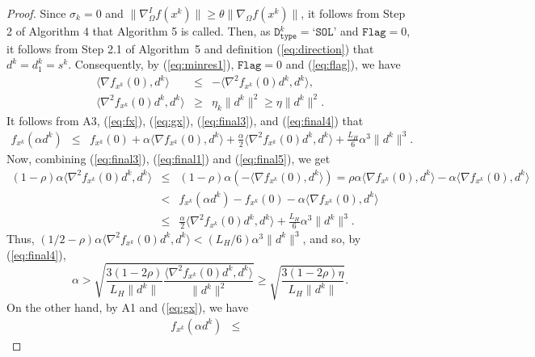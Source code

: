 \documentclass[11pt]{article}
\begin{document}
\begin{proof}
Since $\sigma_{k}=0$ and $\|\nabla_{\Omega}^{I}f(x^{k})\|\geq\theta\|\nabla_{\Omega}f(x^{k})\|$, it follows from Step 2 of Algorithm 4 that Algorithm 5 is called. Then, as $\texttt{D}_{\texttt{type}}^{k}=\texttt{`SOL'}$ and $\texttt{Flag}=0$, it follows from Step 2.1 of Algorithm~5 and definition (\ref{eq:direction}) that $d^{k}=d_{1}^{k}=s^{k}$. Consequently, by (\ref{eq:minres1}), $\texttt{Flag}=0$ and (\ref{eq:flag}), we have
\begin{eqnarray}
\langle\nabla f_{x^{k}}(0),d^{k}\rangle &\leq & -\langle\nabla^{2}f_{x^{k}}(0)d^{k},d^{k}\rangle,
\label{eq:final3}\\
\langle\nabla^{2}f_{x^{k}}(0)d^{k},d^{k}\rangle&\geq& \eta_{k} \|d^{k}\|^{2}\geq \eta\|d^{k}\|^{2}.
\label{eq:final4}
\end{eqnarray}
It follows from A3, (\ref{eq:fx}), (\ref{eq:gx}), (\ref{eq:final3}), and (\ref{eq:final4}) that
\small
\begin{eqnarray}
f_{x^{k}}(\alpha d^{k})&\leq & 
f_{x^{k}}(0)+\alpha\langle\nabla f_{x^{k}}(0),d^{k}\rangle+\frac{\alpha}{2}\langle\nabla^{2}f_{x^{k}}(0)d^{k},d^{k}\rangle+\frac{L_{H}}{6}\alpha^{3}\|d^{k}\|^{3}.
\label{eq:final5}
\end{eqnarray}
\normalsize
Now, combining (\ref{eq:final3}), (\ref{eq:final1}) and (\ref{eq:final5}), we get
\small
\begin{eqnarray*}
(1-\rho)\alpha\langle\nabla^{2}f_{x^{k}}(0)d^{k},d^{k}\rangle&\leq& (1-\rho)\alpha\left(-\langle\nabla f_{x^{k}}(0),d^{k}\rangle\right)= \rho\alpha\langle\nabla f_{x^{k}}(0),d^{k}\rangle-\alpha\langle\nabla f_{x^{k}}(0),d^{k}\rangle\\
&<& f_{x^{k}}(\alpha d^{k})-f_{x^{k}}(0)-\alpha\langle\nabla f_{x^{k}}(0),d^{k}\rangle\\
&\leq &\frac{\alpha}{2}\langle\nabla^{2}f_{x^{k}}(0)d^{k},d^{k}\rangle+\frac{L_{H}}{6}\alpha^{3}\|d^{k}\|^{3}.
\end{eqnarray*}
\normalsize
Thus,
$\left(1/2-\rho\right)\alpha\langle\nabla^{2}f_{x^{k}}(0)d^{k},d^{k}\rangle<(L_{H}/6)\alpha^{3}\|d^{k}\|^{3}$,
and so, by (\ref{eq:final4}), 
\begin{equation}
\alpha>\sqrt{\frac{3(1-2\rho)}{L_{H}\|d^{k}\|}\frac{\langle\nabla^{2}f_{x^{k}}(0)d^{k},d^{k}\rangle}{\|d^{k}\|^{2}}}\geq\sqrt{\frac{3(1-2\rho)\eta}{L_{H}\|d^{k}\|}}.
\label{eq:final6}
\end{equation}
On the other hand, by A1 and (\ref{eq:gx}), we have
\begin{eqnarray}
f_{x^{k}}(\alpha d^{k})&\leq & 

\end{eqnarray}
\end{proof}
\end{document}
